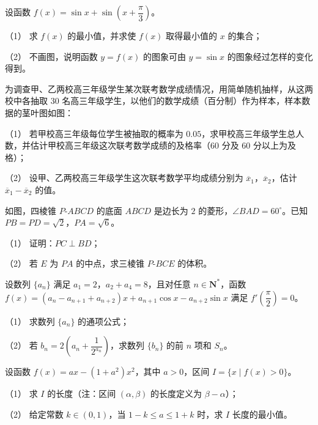 \begin{question}
设函数 $f(x)=\sin x+\sin\left(x+\dfrac\pi3\right)$。

（1） 求 $f(x)$ 的最小值，并求使 $f(x)$ 取得最小值的 $x$ 的集合；

（2） 不画图，说明函数 $y=f(x)$ 的图象可由 $y=\sin x$ 的图象经过怎样的变化得到。

\Needspace{0.4\textheight}
\end{question}
\begin{question}
为调查甲、乙两校高三年级学生某次联考数学成绩情况，用简单随机抽样，从这两校中各抽取 $30$ 名高三年级学生，以他们的数学成绩（百分制）作为样本，样本数据的茎叶图如图：
\nopagebreak[4]
\begin{center}\end{center}
\nopagebreak[4]
（1） 若甲校高三年级每位学生被抽取的概率为 $0.05$，求甲校高三年级学生总人数，并估计甲校高三年级这次联考数学成绩的及格率（$60$ 分及 $60$ 分以上为及格）；

（2） 设甲、乙两校高三年级学生这次联考数学平均成绩分别为 $\overline{x}_1$，$\overline{x}_2$，估计 $\overline{x}_1-\overline{x}_2$ 的值。

\Needspace{0.4\textheight}
\end{question}
\begin{question}
如图，四棱锥 $P\text{-}ABCD$ 的底面 $ABCD$ 是边长为 $2$ 的菱形，$\angle BAD=60^\circ$。已知 $PB=PD=\sqrt2$，$PA=\sqrt6$。

（1） 证明：$PC\perp BD$；

（2） 若 $E$ 为 $PA$ 的中点，求三棱锥 $P\text{-}BCE$ 的体积。
\nopagebreak[4]
\begin{center}\end{center}
\nopagebreak[4]
\end{question}
\begin{question}
设数列 $\{a_n\}$ 满足 $a_1=2$，$a_2+a_4=8$，且对任意 $n\in\mathbf N^*$，函数 $f(x)=(a_n-a_{n+1}+a_{n+2})x+a_{n+1}\cos x-a_{n+2}\sin x$ 满足 $f'\left(\dfrac\pi2\right)=0$。

（1） 求数列 $\{a_n\}$ 的通项公式；

（2） 若 $b_n=2\left(a_n+\dfrac1{2^{a_n}}\right)$，求数列 $\{b_n\}$ 的前 $n$ 项和 $S_n$。

\end{question}
\begin{question}
设函数 $f(x)=ax-(1+a^2)x^2$，其中 $a>0$，区间 $I=\{x\mid f(x)>0\}$。

（1） 求 $I$ 的长度（注：区间 $(\alpha,\beta)$ 的长度定义为 $\beta-\alpha$）；

（2） 给定常数 $k\in(0,1)$，当 $1-k\leqslant a\leqslant1+k$ 时，求 $I$ 长度的最小值。

\end{question}
